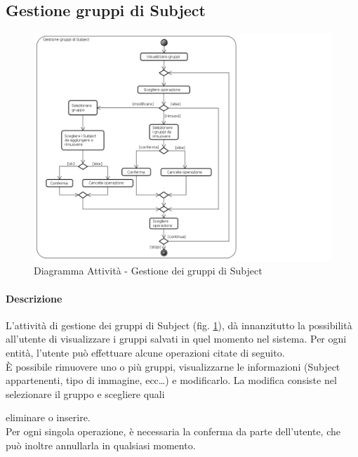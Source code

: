 \subsection{Gestione gruppi di Subject}
\label{ManageGr}
\begin{figure}[!h]
	\centering
	\includegraphics[scale=0.6]{./img/Diagrammi_Attivita/Gestione_gruppi_di_Subject}
	\caption{Diagramma Attività - Gestione dei gruppi di Subject}
	\label{ManageG}
\end{figure}
\paragraph{Descrizione\\}
L'attività di gestione dei gruppi di Subject\glossario{} (fig. \ref{ManageG}), dà innanzitutto la possibilità all'utente di visualizzare i gruppi salvati in quel momento nel sistema. Per ogni entità, l'utente può effettuare alcune operazioni citate di seguito.\\
\`E possibile rimuovere uno o più gruppi, visualizzarne le informazioni (Subject\glossario{} appartenenti, tipo di immagine, ecc\dots) e modificarlo. La modifica consiste nel selezionare il gruppo e scegliere quali \subject{} eliminare o inserire.\\
Per ogni singola operazione, è necessaria la conferma da parte dell'utente, che può inoltre annullarla in qualsiasi momento.
\pagebreak

